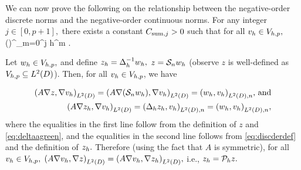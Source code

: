 
We can now prove the following  on the relationship between the negative-order discrete norms and the negative-order continuous norms.
\label{lem:negdiscsum}
For any integer $j \in [0,p+1],$ there exists a constant $C_{\mathrm{sum},j} > 0$ such that for all $v_{h} \in V_{h,p},$
\beqs
{} \leq \mleft(\En\nvar\mright)^{}\Csumj \sum_{m=0}^j h^{m} .
\eeqs
{}
\ele

Let $w_{h} \in V_{h,p},$ and define $z_{h} = \Delta_{h}^{-1} w_{h},$ $z = \mathcal S_{n} w_{h}$ (observe $z$ is well-defined as $\Vhp \subseteq \LtD$). Then, for all $v_{h} \in V_{h,p}$, we have

\begin{align*}
\IPLtD{A \grad z}{\grad \vh} = \IPLtD{A \grad \mleft(\sdsol \wh\mright)}{\grad \vh} = \IPLtDn{\wh}{\vh} \text{, and}\\
\IPLtD{A \grad \zh}{\grad \vh} = \IPLtDn{\Deltah \zh}{\vh} = \IPLtDn{\wh}{\vh},
\end{align*}
where the equalities in the first line follow from the definition of $z$ and \cref{eq:deltaagreen}, and the equalities in the second line follows from \cref{eq:discderdef} and the definition of $z_{h}.$  Therefore (using the fact that $A$ is symmetric), for all $v_{h} \in V_{h,p},$ $\IPLtD{A\grad \vh}{\grad z} = \IPLtD{A\grad \vh}{\grad \zh},$ i.e., $z_{h} = \mathcal P_{h} z.$

